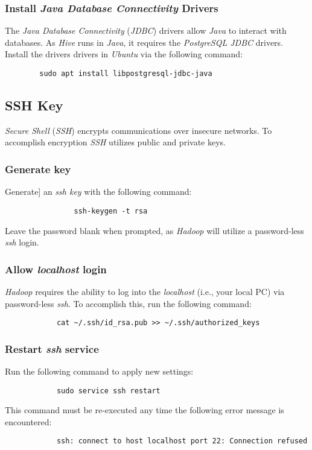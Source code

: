 \documentclass{article}
\begin{document}
    \subsubsection{Install \emph{Java Database Connectivity} Drivers}
    The \emph{Java Database Connectivity} (\emph{JDBC}) drivers allow \emph{Java} to interact with
    databases. As \emph{Hive} runs in \emph{Java}, it requires the \emph{PostgreSQL JDBC} drivers.
    Install the drivers drivers in \emph{Ubuntu} via the following command:
    \begin{verbatim}
        sudo apt install libpostgresql-jdbc-java
    \end{verbatim}

    \subsection{SSH Key}
    \emph{Secure Shell} (\emph{SSH}) encrypts communications over insecure networks. To accomplish encryption
    \emph{SSH} utilizes public and private keys.

        \subsubsection{Generate key}
        Generate] an \emph{ssh key} with the following command:
            \begin{verbatim}
                ssh-keygen -t rsa
            \end{verbatim}
        Leave the password blank when prompted, as \emph{Hadoop} will utilize a password-less \emph{ssh}
        login.

        \subsubsection{Allow \emph{localhost} login}
        \emph{Hadoop} requires the ability to log into the \emph{localhost} (i.e., your local PC) via
        password-less \emph{ssh}. To accomplish this, run the following command:
        \begin{verbatim}
            cat ~/.ssh/id_rsa.pub >> ~/.ssh/authorized_keys
        \end{verbatim}

        \subsubsection{Restart \emph{ssh} service}
        \label{subsec:sshrestart}
        Run the following command to apply new settings:
        \begin{verbatim}
            sudo service ssh restart
        \end{verbatim}
        This command must be re-executed any time the following error message is encountered:
        \begin{verbatim}
            ssh: connect to host localhost port 22: Connection refused
        \end{verbatim}
\end{document}
